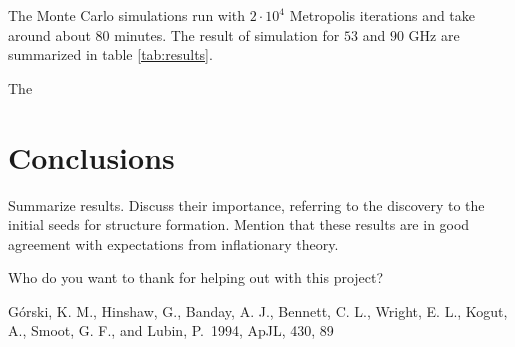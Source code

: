 \documentclass{emulateapj}
\begin{document}
The Monte Carlo simulations run with $2\cdot 10^4$ Metropolis iterations and take around about $80$ minutes. The result of simulation for $53$ and $90$ GHz are summarized in table \ref{tab:results}.\

The 









\section{Conclusions}
\label{sec:conclusions}

Summarize results. Discuss their importance, referring to the
discovery to the initial seeds for structure formation. Mention that
these results are in good agreement with expectations from
inflationary theory.








\begin{acknowledgements}
  Who do you want to thank for helping out with this project?
\end{acknowledgements}

\begin{thebibliography}{}

 G{\'o}rski, K. M.,
  Hinshaw, G., Banday, A. J., Bennett, C. L., Wright, E. L., Kogut,
  A., Smoot, G. F., and Lubin, P.\ 1994, ApJL, 430, 89

\end{thebibliography}
\end{document}
